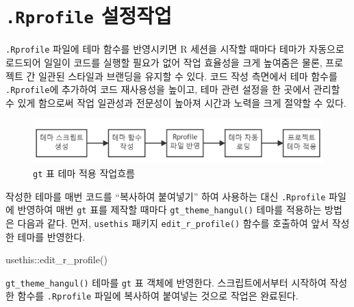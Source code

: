 \documentclass[
  letterpaper,
]{book}
\newenvironment{Shaded}{\begin{snugshade}}{\end{snugshade}}
\newcommand{\FunctionTok}[1]{\textcolor[rgb]{0.28,0.35,0.67}{#1}}
\newcommand{\NormalTok}[1]{\textcolor[rgb]{0.00,0.23,0.31}{#1}}
\newcommand{\SpecialCharTok}[1]{\textcolor[rgb]{0.37,0.37,0.37}{#1}}
\begin{document}
\hypertarget{rprofile-uxc124uxc815uxc791uxc5c5}{%
\section{\texorpdfstring{\texttt{.Rprofile}
설정작업}{.Rprofile 설정작업}}\label{rprofile-uxc124uxc815uxc791uxc5c5}}

\texttt{.Rprofile} 파일에 테마 함수를 반영시키면 R 세션을 시작할 때마다
테마가 자동으로 로드되어 일일이 코드를 실행할 필요가 없어 작업 효율성을
크게 높여줌은 물론, 프로젝트 간 일관된 스타일과 브랜딩을 유지할 수 있다.
코드 작성 측면에서 테마 함수를 \texttt{.Rprofile}에 추가하여 코드
재사용성을 높이고, 테마 관련 설정을 한 곳에서 관리할 수 있게 함으로써
작업 일관성과 전문성이 높아져 시간과 노력을 크게 절약할 수 있다.

\begin{figure}

{\centering \includegraphics{images/gt_theme_hangul_workflow.png}

}

\caption{\texttt{gt} 표 테마 적용 작업흐름}

\end{figure}

작성한 테마를 매번 코드를 ``복사하여 붙여넣기'' 하여 사용하는 대신
\texttt{.Rprofile} 파일에 반영하여 매번 \texttt{gt} 표를 제작할 때마다
\texttt{gt\_theme\_hangul()} 테마를 적용하는 방법은 다음과 같다. 먼저,
\texttt{usethis} 패키지 \texttt{edit\_r\_profile()} 함수를 호출하여 앞서
작성한 테마를 반영한다.

\begin{Shaded}
\begin{Highlighting}[]
\NormalTok{usethis}\SpecialCharTok{::}\FunctionTok{edit\_r\_profile}\NormalTok{()}
\end{Highlighting}
\end{Shaded}

\texttt{gt\_theme\_hangul()} 테마를 \texttt{gt} 표 객체에 반영한다.
스크립트에서부터 시작하여 작성한 함수를 \texttt{.Rprofile} 파일에
복사하여 붙여넣는 것으로 작업은 완료된다.
\end{document}
